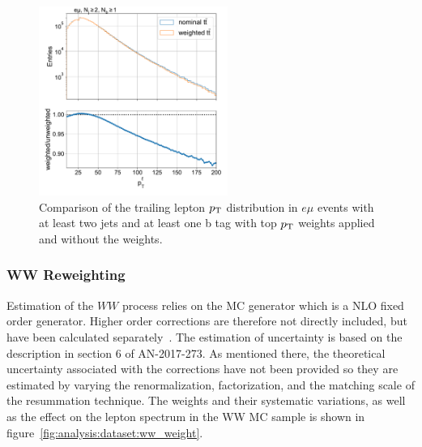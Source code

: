 \begin{figure}[ht]
    \centering
    \includegraphics[width=0.55\textwidth]{chapters/Analysis/sectionDataset/figures/top_pt_weight}
    \caption{Comparison of the trailing lepton $p_{\mathrm{T}}$ distribution in $e\mu$ events with at least two jets and at least one b tag with top $p_{\mathrm{T}}$ weights applied and without the weights.}
    \label{fig:analysis:dataset:top_pt_weight}
\end{figure}


\subsubsection{WW \pt Reweighting}
Estimation of the $WW$ process relies on the \POWHEG MC generator which is a NLO fixed order generator. Higher order corrections are therefore not directly included, but have been calculated separately~\cite{Meade:2014fca, Jaiswal:2014yba, Grazzini:2015wpa}.  The estimation of uncertainty is based on the description in section 6 of AN-2017-273. As mentioned there, the theoretical uncertainty associated with the corrections have not been provided so they are estimated by varying the renormalization, factorization, and the matching scale of the \pt resummation technique. The weights and their systematic variations, as well as the effect on the lepton \pt spectrum in the WW MC sample is shown in figure~\ref{fig:analysis:dataset:ww_weight}.

